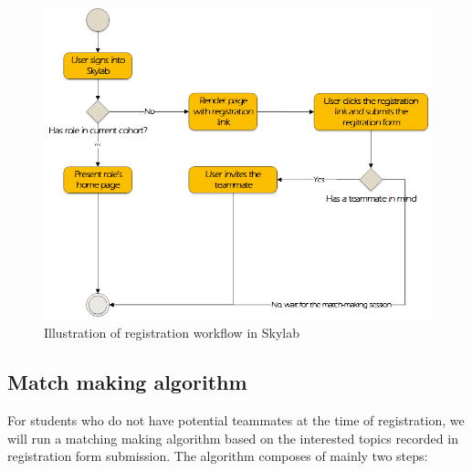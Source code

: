 \begin{figure}[h]
  \centering
  \includegraphics[width=\textwidth]{Images/Skylab_Registration_Workflow.png}
  \caption{Illustration of registration workflow in Skylab}
  \label{fig:RegistrationWorkflow}
\end{figure}

\subsection{Match making algorithm}

For students who do not have potential teammates at the time of registration, we will run a matching making algorithm based on the interested topics recorded in registration form submission. The algorithm composes of mainly two steps:

